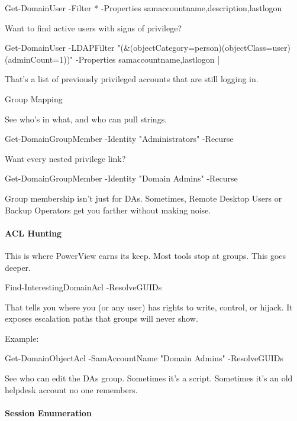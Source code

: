  

 

Get-DomainUser -Filter * -Properties samaccountname,description,lastlogon

Want to find active users with signs of privilege?

 

 

Get-DomainUser -LDAPFilter "(\&(objectCategory=person)(objectClass=user)(adminCount=1))" -Properties samaccountname,lastlogon |

That’s a list of previously privileged accounts that are still logging in.

Group Mapping

See who’s in what, and who can pull strings.

 

 

Get-DomainGroupMember -Identity "Administrators" -Recurse

Want every nested privilege link?

 

 

Get-DomainGroupMember -Identity "Domain Admins" -Recurse

Group membership isn’t just for DAs. Sometimes, Remote Desktop Users or Backup Operators get you farther without making noise.

\paragraph{   ACL Hunting}

This is where PowerView earns its keep. Most tools stop at groups. This goes deeper.

 

 

Find-InterestingDomainAcl -ResolveGUIDs

That tells you where you (or any user) has rights to write, control, or hijack. It exposes escalation paths that groups will never show.

Example:

 

 

Get-DomainObjectAcl -SamAccountName "Domain Admins" -ResolveGUIDs

See who can edit the DAs group. Sometimes it’s a script. Sometimes it’s an old helpdesk account no one remembers.

\paragraph{   Session Enumeration}

